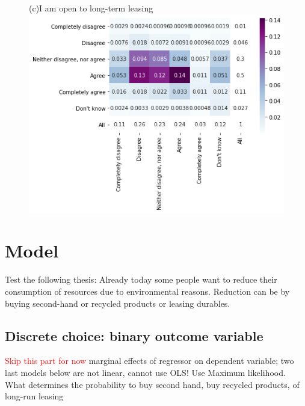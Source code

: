 \documentclass[12pt]{article}
\newcommand{\tr}[1]{\textcolor{red}{#1}}
\begin{document}
\begin{figure}[h!!]
\begin{minipage}[h!!]{0.32\textwidth}
	\end{minipage}
	\begin{minipage}[h!!]{0.32\textwidth}  
		\centering\footnotesize{(c)I am open to long-term leasing}
		\includegraphics[width=1\textwidth]{../codding_data/results/liss/joint_heatmap175_141labels0.png}
	\end{minipage}
\end{figure}

\newpage
\section{Model}
Test the following thesis: Already today some people want to reduce their consumption of resources due to environmental reasons. Reduction can be by buying second-hand or recycled products or leasing durables. 

\subsection{Discrete choice: binary outcome variable}
\tr{Skip this part for now}
marginal effects of regressor on dependent variable; two last models below are not linear, cannot use OLS! Use Maximum likelihood. \\
What determines the probability to buy second hand, buy recycled products, of long-run leasing
\end{document}
